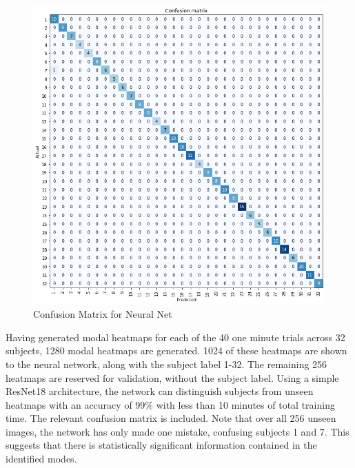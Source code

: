\begin{figure}
\centering
\includegraphics[scale=0.4]{../../../figures/conf_mat.png}  
\caption{Confusion Matrix for Neural Net}
\end{figure}
Having generated modal heatmaps for each of the 40 one minute trials across 32 subjects, 1280 modal heatmaps are generated. 1024 of these heatmaps are shown to the neural network, along with the subject label 1-32. The remaining 256 heatmaps are reserved for validation, without the subject label. Using a simple ResNet18 architecture, the network can distinguish subjects from unseen heatmaps with an accuracy of 99\% with less than 10 minutes of total training time. The relevant confusion matrix is included. Note that over all 256 unseen images, the network has only made one mistake, confusing subjects 1 and 7. This suggests that there is statistically significant information contained in the identified modes.







